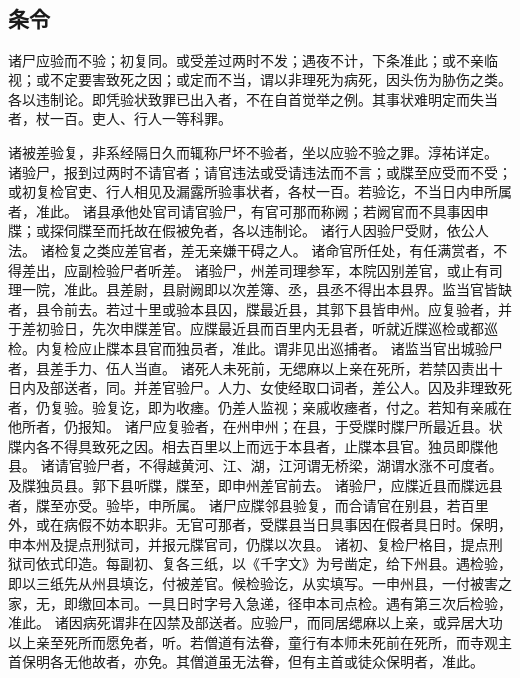 \documentclass[12pt,UTF8]{ctexbook}
\begin{document}
~\\

\part{}

\chapter{条令}

诸尸应验而不验；初复同。或受差过两时不发；遇夜不计，下条准此；或不亲临视；或不定要害致死之因；或定而不当，谓以非理死为病死，因头伤为胁伤之类。各以违制论。即凭验状致罪已出入者，不在自首觉举之例。其事状难明定而失当者，杖一百。吏人、行人一等科罪。

诸被差验复，非系经隔日久而辄称尸坏不验者，坐以应验不验之罪。淳祐详定。
诸验尸，报到过两时不请官者；请官违法或受请违法而不言；或牒至应受而不受；或初复检官吏、行人相见及漏露所验事状者，各杖一百。若验讫，不当日内申所属者，准此。
诸县承他处官司请官验尸，有官可那而称阙；若阙官而不具事因申牒；或探伺牒至而托故在假被免者，各以违制论。
诸行人因验尸受财，依公人法。
诸检复之类应差官者，差无亲嫌干碍之人。
诸命官所任处，有任满赏者，不得差出，应副检验尸者听差。
诸验尸，州差司理参军，本院囚别差官，或止有司理一院，准此。县差尉，县尉阙即以次差簿、丞，县丞不得出本县界。监当官皆缺者，县令前去。若过十里或验本县囚，牒最近县，其郭下县皆申州。应复验者，并于差初验日，先次申牒差官。应牒最近县而百里内无县者，听就近牒巡检或都巡检。内复检应止牒本县官而独员者，准此。谓非见出巡捕者。
诸监当官出城验尸者，县差手力、伍人当直。
诸死人未死前，无缌麻以上亲在死所，若禁囚责出十日内及部送者，同。并差官验尸。人力、女使经取口词者，差公人。囚及非理致死者，仍复验。验复讫，即为收瘗。仍差人监视；亲戚收瘗者，付之。若知有亲戚在他所者，仍报知。
诸尸应复验者，在州申州；在县，于受牒时牒尸所最近县。状牒内各不得具致死之因。相去百里以上而远于本县者，止牒本县官。独员即牒他县。
诸请官验尸者，不得越黄河、江、湖，江河谓无桥梁，湖谓水涨不可度者。及牒独员县。郭下县听牒，牒至，即申州差官前去。
诸验尸，应牒近县而牒远县者，牒至亦受。验毕，申所属。
诸尸应牒邻县验复，而合请官在别县，若百里外，或在病假不妨本职非。无官可那者，受牒县当日具事因在假者具日时。保明，申本州及提点刑狱司，并报元牒官司，仍牒以次县。
诸初、复检尸格目，提点刑狱司依式印造。每副初、复各三纸，以《千字文》为号凿定，给下州县。遇检验，即以三纸先从州县填讫，付被差官。候检验讫，从实填写。一申州县，一付被害之家，无，即缴回本司。一具日时字号入急递，径申本司点检。遇有第三次后检验，准此。
诸因病死谓非在囚禁及部送者。应验尸，而同居缌麻以上亲，或异居大功以上亲至死所而愿免者，听。若僧道有法眷，童行有本师未死前在死所，而寺观主首保明各无他故者，亦免。其僧道虽无法眷，但有主首或徒众保明者，准此。
\end{document}

